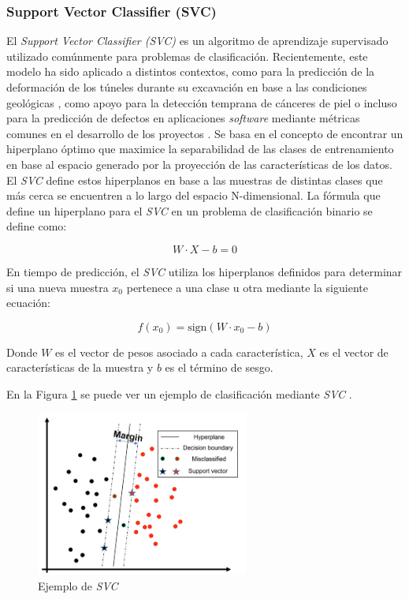 \subsubsection*{Support Vector Classifier (SVC)}


El \textit{Support Vector Classifier (SVC)} es un algoritmo de aprendizaje supervisado utilizado comúnmente para problemas de clasificación. Recientemente, este modelo ha sido aplicado a distintos contextos, como para la predicción de la deformación de los túneles durante su excavación en base a las condiciones geológicas \cite{zhou2022predicting}, como apoyo para la detección temprana de cánceres de piel \cite{arora2022bag} o incluso para la predicción de defectos en aplicaciones \textit{software} mediante métricas comunes en el desarrollo de los proyectos \cite{goyal2022effective}. Se basa en el concepto de encontrar un hiperplano óptimo que maximice la separabilidad de las clases de entrenamiento en base al espacio generado por la proyección de las características de los datos. El \textit{SVC} define estos hiperplanos en base a las muestras de distintas clases que más cerca se encuentren a lo largo del espacio N-dimensional. La fórmula que define un hiperplano para el \textit{SVC} en un problema de clasificación binario se define como:

\[
W \cdot X - b = 0
\]

En tiempo de predicción, el \textit{SVC} utiliza los hiperplanos definidos para determinar si una nueva muestra $x_0$ pertenece a una clase u otra mediante la siguiente ecuación:

\[
f({x_0}) = \text{sign}({W} \cdot {x_0} - b)
\]

Donde $W$ es el vector de pesos asociado a cada característica, $X$ es el vector de características de la muestra y $b$ es el término de sesgo.

En la Figura \ref{SVC_BACKGROUND} se puede ver un ejemplo de clasificación mediante \textit{SVC} \cite{MISRA2020243}.

\begin{figure}[H]
	\centering
	\includegraphics[width=7cm]{Figures/Background/SVC.png}
	\caption{Ejemplo de \textit{SVC}}
	\label{SVC_BACKGROUND}
\end{figure}

